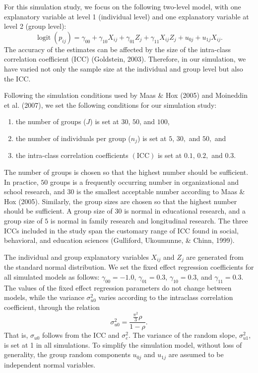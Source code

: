 \documentclass[12pt,oneside,a4paper]{reedthesis}
\providecommand{\tightlist}{%
  \setlength{\itemsep}{0pt}\setlength{\parskip}{0pt}}
\begin{document}
For this simulation study, we focus on the following two-level model, with one explanatory variable at level 1 (individual level) and one explanatory variable at level 2 (group level):
\begin{equation} 
\operatorname{logit}\left(p_{i j}\right)=\gamma_{00}+\gamma_{10} X_{i j}+\gamma_{01} Z_{j}+\gamma_{11} X_{i j} Z_{j}+u_{0 j}+u_{1 j} X_{i j}.
\label{eqn:simulation_model}
\end{equation}
The accuracy of the estimates can be affected by the size of the intra-class correlation coefficient (ICC) (Goldstein, 2003). Therefore, in our simulation, we have varied not only the sample size at the individual and group level but also the ICC.

Following the simulation conditions used by Maas \& Hox (2005) and Moineddin et al. (2007), we set the following conditions for our simulation study:
\begin{enumerate}
\def\labelenumi{\arabic{enumi}.}
\tightlist
\item
  the number of groups (\textbf{\(J\)}) is set at \(30\), \(50\), and \(100\),
\item
  the number of individuals per group (\textbf{\(n_{j}\)}) is set at \(5\), \(30,\) and \(50,\) and
\item
  the intra-class correlation coefficients \((\mathrm{ICC})\) is set at \(0.1\), \(0.2,\) and \(0.3\).
\end{enumerate}
The number of groups is chosen so that the highest number should be sufficient. In practice, \(50\) groups is a frequently occurring number in organizational and school research, and \(30\) is the smallest acceptable number according to Maas \& Hox (2005). Similarly, the group sizes are chosen so that the highest number should be sufficient. A group size of \(30\) is normal in educational research, and a group size of \(5\) is normal in family research and longitudinal research. The three ICCs included in the study span the customary range of ICC found in social, behavioral, and education sciences (Gulliford, Ukoumunne, \& Chinn, 1999).

The individual and group explanatory variables \(X_{i j}\) and \(Z_{j}\) are generated from the standard normal distribution. We set the fixed effect regression coefficients for all simulated models as follows:
\(\gamma_{00}=-1.0\), \(\gamma_{01}=0.3\), \(\gamma_{10}=0.3\), and \(\gamma_{11}=0.3\).
The values of the fixed effect regression parameters do not change between models, while the variance \(\sigma^2_{u0}\) varies according to the intraclass correlation coefficient, through the relation
\begin{equation}
\sigma_{u0}^{2}=\frac{\frac{\pi^{2}}{3} \rho}{1-\rho}.
\end{equation}
That is, \(\sigma_{u0}\) follows from the ICC and \(\sigma^2_e\). The variance of the random slope, \(\sigma^2_{u1}\), is set at 1 in all simulations. To simplify the simulation model, without loss of generality, the group random components \(u_{0 j}\) and \(u_{1 j}\) are assumed to be independent normal variables.
\end{document}
